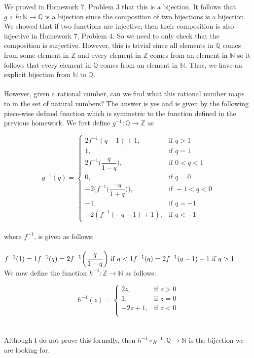 \documentclass[12pt]{article}
\begin{document}
We proved in Homework 7, Problem 3 that this is a bijection. It follows that $g~\circ~ h: \mathbb{N} \rightarrow \mathbb{Q}$ is a bijection since the composition of two bijections is a bijection. We showed that if two functions are injective, then their composition is also injective in Homework 7, Problem 4. So we need to only check that the composition is surjective. However, this is trivial since all elements in $\mathbb{Q}$ comes from some element in $\mathbb{Z}$ and every element in $\mathbb{Z}$ comes from an element in $\mathbb{N}$ so it follows that every element in $\mathbb{Q}$ comes from an element in $\mathbb{N}$. Thus, we have an explicit bijection from $\mathbb{N}$ to $\mathbb{Q}$. \\ \\

However, given a rational number, can we find what this rational number maps to in the set of natural numbers? The answer is yes and is given by the following piece-wise defined function which is symmetric to the function defined in the previous homework. We first define $g^{-1}: \mathbb{Q} \rightarrow \mathbb{Z}$ as 

$$
g^{-1}(q) =
\begin{cases}
2f^{-1}(q-1)+1, & \text{if } q>1 \\
1, & \text{if } q=1 \\
2f^{-1} \bigg(\dfrac{q}{1-q} \bigg), & \text{if } 0<q<1 \\ 
0, & \text{if } q=0  \\
-2 \Bigg(f^{-1} \bigg(\dfrac{-q}{1+q}\bigg) \Bigg), & \text{if } -1<q<0 \\
-1, & \text{if } q=-1 \\ 
-2(f^{-1}(-q-1)+1), & \text{if } q<-1
\end{cases}
$$ \\

\noindent where $f^{-1}$, is given as follows: \\ \\
$f^{-1}(1)=1 \\
f^{-1}(q)= 2f^{-1} \bigg(\dfrac{q}{1-q} \bigg) ~ \text{if} ~ q<1 \\
f^{-1}(q) = 2f^{-1}(q-1)+1 ~\text{if}~ q>1$ \\ 

We now define the function $h^{-1}: \mathbb{Z} \rightarrow \mathbb{N}$ as follows: 

$$
h^{-1}(z)=
\begin{cases}
2z, & \text{if } z>0 \\
1, & \text{if } z=0 \\
-2z+1, & \text{if } z<0 \\
\end{cases}
$$ \\ \\

Although I do not prove this formally, then $h^{-1} \circ g^{-1}: \mathbb{Q} \rightarrow \mathbb{N}$ is the bijection we are looking for.
\end{document}
